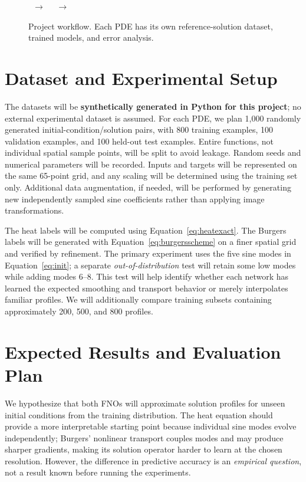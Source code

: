 \documentclass{article}
\begin{document}
\begin{figure}[t]
\centering
\setlength{\fboxsep}{5pt}
\ $\longrightarrow$\ 
\ $\longrightarrow$\ 
\caption{Project workflow. Each PDE has its own reference-solution dataset, trained models, and error analysis.}
\label{fig:workflow}
\end{figure}

\section{Dataset and Experimental Setup}
The datasets will be \textbf{synthetically generated in Python for this project}; no external experimental dataset is assumed. For each PDE, we plan 1,000 randomly generated initial-condition/solution pairs, with 800 training examples, 100 validation examples, and 100 held-out test examples. Entire functions, not individual spatial sample points, will be split to avoid leakage. Random seeds and numerical parameters will be recorded. Inputs and targets will be represented on the same 65-point grid, and any scaling will be determined using the training set only. Additional data augmentation, if needed, will be performed by generating new independently sampled sine coefficients rather than applying image transformations.

The heat labels will be computed using Equation~\eqref{eq:heatexact}. The Burgers labels will be generated with Equation~\eqref{eq:burgersscheme} on a finer spatial grid and verified by refinement. The primary experiment uses the five sine modes in Equation~\eqref{eq:init}; a separate \emph{out-of-distribution} test will retain some low modes while adding modes 6--8. This test will help identify whether each network has learned the expected smoothing and transport behavior or merely interpolates familiar profiles. We will additionally compare training subsets containing approximately 200, 500, and 800 profiles.

\section{Expected Results and Evaluation Plan}
We hypothesize that both FNOs will approximate solution profiles for unseen initial conditions from the training distribution. The heat equation should provide a more interpretable starting point because individual sine modes evolve independently; Burgers' nonlinear transport couples modes and may produce sharper gradients, making its solution operator harder to learn at the chosen resolution. However, the difference in predictive accuracy is an \emph{empirical question}, not a result known before running the experiments.
\end{document}

